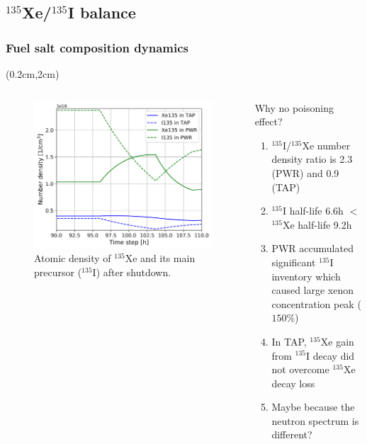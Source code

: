 \subsection{$^{135}$Xe/$^{135}$I balance}
\begin{frame}
\frametitle{Fuel salt composition dynamics}
\begin{textblock*}{12.5cm}(0.2cm,2cm) %
	\begin{columns}[t,onlytextwidth]
		\begin{figure}[t]
	\includegraphics[width=\linewidth]{./images/tap_vs_pwr_xe_i_density.png}
		\caption{Atomic density of $^{135}$Xe and its main precursor 
		($^{135}$I) after shutdown.}
		\end{figure}
			\vspace{+5mm}
		\begin{block}{Why no poisoning effect?}
			\begin{enumerate}             
				\item $^{135}$I/$^{135}$Xe number density ratio is 2.3 (PWR) 
				and 0.9 (TAP)
				\item $^{135}$I half-life 6.6h $<$ $^{135}$Xe half-life 9.2h
				\item PWR accumulated significant $^{135}$I inventory which 
				caused large xenon concentration  peak ($150\%$)
				\item In TAP, $^{135}$Xe gain from $^{135}$I decay did
				not overcome $^{135}$Xe decay loss
				\item Maybe because the neutron spectrum is different?
			\end{enumerate}
		\end{block}
	\end{columns}
\end{textblock*}
\end{frame}

